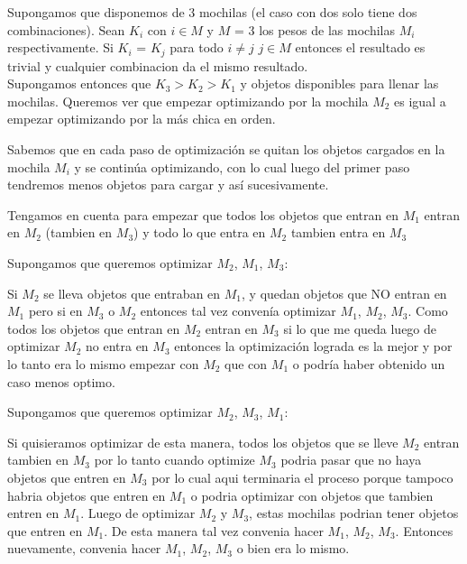 Supongamos que disponemos de 3 mochilas (el caso con dos solo tiene dos combinaciones). 
Sean $K_i$ con $i \in M$ y $M$ = 3 los pesos de las mochilas $M_i$ respectivamente. Si $K_i$ = $K_j$ para todo $i \neq j$ $j \in M$ entonces el resultado es trivial y cualquier combinacion da el mismo resultado. \\

Supongamos entonces que $K_3 > K_2 > K_1$ y objetos disponibles para llenar las mochilas. Queremos ver que empezar optimizando por la mochila $M_2$ es igual a empezar optimizando por la más chica en orden. 

Sabemos que en cada paso de optimización se quitan los objetos cargados en la mochila $M_i$ y se continúa optimizando, con lo cual luego del primer paso tendremos menos objetos para cargar y así sucesivamente.

Tengamos en cuenta para empezar que todos los objetos que entran en $M_1$ entran en $M_2$ (tambien en $M_3$) y todo lo que entra en $M_2$ tambien entra en $M_3$ 

Supongamos que queremos optimizar $M_2$, $M_1$, $M_3$:

Si $M_2$ se lleva objetos que entraban en $M_1$, y quedan objetos que NO entran en $M_1$ pero si en $M_3$ o $M_2$ entonces tal vez convenía optimizar $M_1$, $M_2$, $M_3$. Como todos los objetos que entran en $M_2$ entran en $M_3$ si lo que me queda luego de optimizar $M_2$ no entra en $M_3$ entonces la optimización lograda es la mejor y por lo tanto era lo mismo empezar con $M_2$ que con $M_1$ o podría haber obtenido un caso menos optimo.

Supongamos que queremos optimizar $M_2$, $M_3$, $M_1$: 

Si quisieramos optimizar de esta manera, todos los objetos que se lleve $M_2$ entran tambien en $M_3$ por lo tanto cuando optimize $M_3$ podria pasar que no haya objetos que entren en $M_3$ por lo cual aqui terminaria el proceso porque tampoco habria objetos que entren en $M_1$ o podria optimizar con objetos que tambien entren en $M_1$. Luego de optimizar $M_2$ y $M_3$, estas mochilas podrian tener objetos que entren en $M_1$. De esta manera tal vez convenia hacer $M_1$, $M_2$, $M_3$.
Entonces nuevamente, convenia hacer $M_1$, $M_2$, $M_3$ o bien era lo mismo. 

